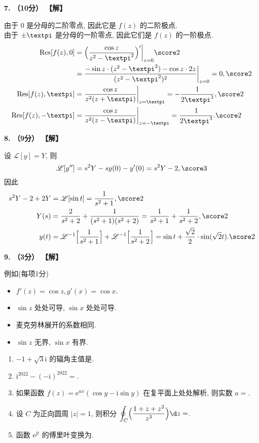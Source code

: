 \documentclass[simple]{hfutexam}
\DeclareMathOperator{\Res}{Res}
\newcommand\msl{\mathscr{L}}
\newcommand{\ii}{\mathrm{i}}
\newcommand{\jj}{\mathrm{j}}
\newcommand{\ee}{\mathrm{e}}
\newcommand{\cpi}{{\text{\textpi}}}
\newcommand{\doint}{\displaystyle\oint}
\begin{document}
\textbf{7. （10分） 【解】}

由于 $0$ 是分母的二阶零点, 因此它是 $f(z)$ 的二阶极点. \\
由于 $\pm\cpi$ 是分母的一阶零点, 因此它们是 $f(z)$ 的一阶极点. 
\begin{align*}
  \Res[f(z),0]&
  =\Bigl(\frac{\cos z}{z^2-\cpi^2}\Bigr)'\bigg|_{z=0} \score2\\&
  =\frac{-\sin z\cdot(z^2-\cpi^2)-\cos z\cdot 2z}{(z^2-\cpi^2)^2}\bigg|_{z=0}=0, \score2\\
  \Res[f(z),\cpi]&
  =\frac{\cos z}{z^2(z+\cpi)}\bigg|_{z=\cpi}
  =-\frac1{2\cpi^3}, \score2\\
  \Res[f(z),-\cpi]&
  =\frac{\cos z}{z^2(z-\cpi)}\bigg|_{z=-\cpi}
  =\frac1{2\cpi^3}. \score2
\end{align*}

\textbf{8. （9分） 【解】}

设 $\msl[y]=Y$, 则
\[\msl[y'']=s^2Y-sy(0)-y'(0)=s^2Y-2, \score3\]
因此
\begin{align*}
  s^2Y-2+2Y&
  =\msl[\sin t]=\frac{1}{s^2+1}, \score2\\
  Y(s)&
  =\frac{2}{s^2+2}+\frac{1}{(s^2+1)(s^2+2)}
  =\frac{1}{s^2+1}+\frac{1}{s^2+2}, \score2\\
  y(t)&
  =\msl^{-1}\Bigl[\frac{1}{s^2+1}\Bigr]+\msl^{-1}\Bigl[\frac{1}{s^2+2}\Bigr]
  =\sin t+\frac{\sqrt 2}2\cdot\sin(\sqrt 2 t). \score2
\end{align*}

\textbf{9. （3分） 【解】}

例如(每项1分)
\begin{itemize}
  \item $f'(z)=\cos z,g'(x)=\cos x$. 
  \item $\sin z$ 处处可导, $\sin x$ 处处可导. 
  \item 麦克劳林展开的系数相同. 
  \item $\sin z$ 无界, $\sin x$ 有界. 
\end{itemize}


\newpage
{}
\ZhuanYeBanJi{}
\KaoShiRiQi{}
\maketitle

\begin{enumerate}
  \item $-1+\sqrt 3\ii$ 的辐角主值是\fillblank{}.
  \item $\ii^{2022}-(-\ii)^{2022}=$\fillblank{}.
  \item 如果函数 $f(z)=\ee^{ax}(\cos y-\ii \sin y)$ 在复平面上处处解析, 则实数 $a=$\fillblank[25mm]{}.
  \item 设 $C$ 为正向圆周 $|z|=1$, 则积分 $\doint_C\Bigl(\frac{1+z+z^2}{z^3}\Bigr)\d z=$\fillblank{}.
  \item 函数 $\ee^{\jj t}$ 的傅里叶变换为\fillblank{}.
\end{enumerate}
\end{document}

